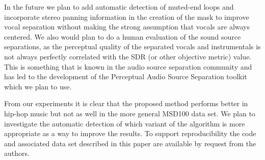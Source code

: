 \documentclass{article}
\begin{document}
In the future we plan to add automatic detection of muted-end loops
and incorporate stereo panning information in the creation of the mask
to improve vocal separation without making the strong assumption that
vocals are always centered.  We also would plan to do a human evaluation
of the sound source separations, as the perceptual quality of the 
separated vocals and instrumentals is not always
perfectly correlated with the SDR (or other objective metric)
value. This is something that is known in the audio source separation
community and has led to the development of the Perceptual Audio
Source Separation toolkit \cite{peass} which we plan to use. 

From our experiments it is clear that the proposed method performs
better in hip-hop music but not as well in the more general MSD100
data set.  We plan to investigate the automatic detection of which
variant of the algorithm is more appropriate as a way to improve the
results. To support reproducibility the code and associated data set 
described in this paper are available by request from the authors. 





\end{document}
